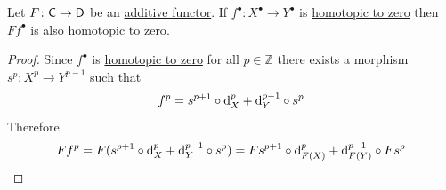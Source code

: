 \documentclass[../../main]{subfiles}
\begin{document}
\begin{lemma}\label{lemma:additive-preserves-homotopy}
  Let \(F\colon \mathsf{C} \to \mathsf{D}\) be an \hyperref[def:additive-functor]{additive functor}.
  If \(f^{\bullet}\colon X^{\bullet} \to Y^{\bullet}\) is \hyperref[def:homotopy]{homotopic to zero} then \(Ff^{\bullet}\) is also \hyperref[def:homotopy]{homotopic to zero}.
\end{lemma}
\begin{proof}
  Since \(f^{\bullet}\) is \hyperref[def:homotopy]{homotopic to zero} for all \(p \in \mathbb{Z}\) there exists a morphism \(s^{p}\colon X^{p} \to Y^{p-1}\) such that
  \begin{equation*}
    f^{p} = s^{p+1} \circ \mathrm{d}_{X}^{p} + \mathrm{d}_{Y}^{p-1} \circ s^{p}
  \end{equation*}
  Therefore
  \begin{equation*}
    Ff^{p} = F(s^{p+1} \circ \mathrm{d}_{X}^{p} + \mathrm{d}_{Y}^{p-1} \circ s^{p}) = Fs^{p+1} \circ \mathrm{d}_{F(X)}^{p} + \mathrm{d}_{F(Y)}^{p-1} \circ Fs^{p} \qedhere
  \end{equation*}
\end{proof}



  
\end{document}

